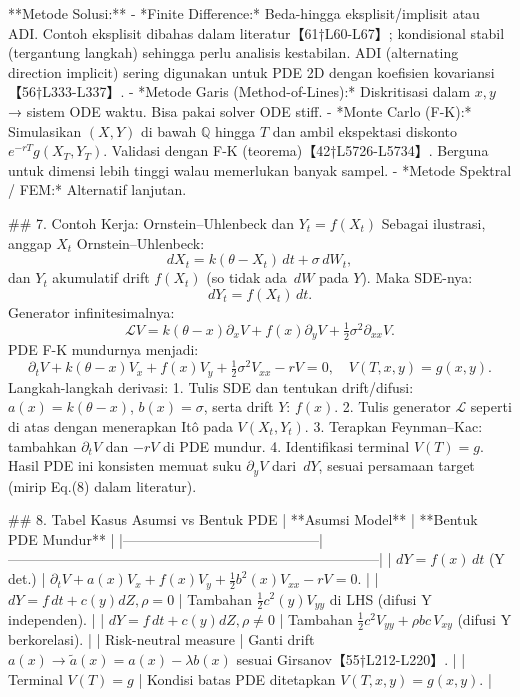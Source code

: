 \documentclass{article}
\begin{document}
**Metode Solusi:**  
- *Finite Difference:* Beda-hingga eksplisit/implisit atau ADI. Contoh eksplisit dibahas dalam literatur【61†L60-L67】; kondisional stabil (tergantung langkah) sehingga perlu analisis kestabilan. ADI (alternating direction implicit) sering digunakan untuk PDE 2D dengan koefisien kovariansi【56†L333-L337】.  
- *Metode Garis (Method-of-Lines):* Diskritisasi dalam \(x,y\) → sistem ODE waktu. Bisa pakai solver ODE stiff.  
- *Monte Carlo (F-K):* Simulasikan \((X,Y)\) di bawah \(\mathbb{Q}\) hingga \(T\) dan ambil ekspektasi diskonto \(e^{-rT}g(X_T,Y_T)\). Validasi dengan F-K (teorema)【42†L5726-L5734】. Berguna untuk dimensi lebih tinggi walau memerlukan banyak sampel.  
- *Metode Spektral / FEM:* Alternatif lanjutan.  

## 7. Contoh Kerja: Ornstein–Uhlenbeck dan \(Y_t=f(X_t)\)  
Sebagai ilustrasi, anggap \(X_t\) Ornstein–Uhlenbeck:  
$$dX_t = k(\theta - X_t)\,dt + \sigma\,dW_t,$$ 
dan \(Y_t\) akumulatif drift \(f(X_t)\) (so tidak ada \(\,dW\) pada \(Y\)). Maka SDE-nya:  
$$dY_t = f(X_t)\,dt.$$  
Generator infinitesimalnya:  
$$\mathcal{L}V = k(\theta-x)\partial_xV + f(x)\partial_yV + \tfrac12\sigma^2\partial_{xx}V.$$  
PDE F-K mundurnya menjadi:  
$$\partial_tV + k(\theta-x)V_x + f(x)V_y + \tfrac12\sigma^2V_{xx} - rV = 0,\quad V(T,x,y)=g(x,y).$$  
Langkah-langkah derivasi:  
1. Tulis SDE dan tentukan drift/difusi: \(a(x)=k(\theta-x)\), \(b(x)=\sigma\), serta drift \(Y\): \(f(x)\).  
2. Tulis generator \(\mathcal{L}\) seperti di atas dengan menerapkan Itô pada \(V(X_t,Y_t)\).  
3. Terapkan Feynman–Kac: tambahkan \(\partial_tV\) dan \(-rV\) di PDE mundur.  
4. Identifikasi terminal \(V(T)=g\).  
Hasil PDE ini konsisten memuat suku \(\partial_yV\) dari \(\,dY\), sesuai persamaan target (mirip Eq.(8) dalam literatur).  

## 8. Tabel Kasus Asumsi vs Bentuk PDE  
| **Asumsi Model**                          | **Bentuk PDE Mundur**                                                         |
|------------------------------------------|--------------------------------------------------------------------------------|
| \(dY=f(x)\,dt\) (Y det.)               | \(\partial_tV + a(x)V_x + f(x)V_y + \tfrac12b^2(x)V_{xx} -rV =0\).              |
| \(dY=f\,dt + c(y)dZ, \rho=0\)          | Tambahan \(\tfrac12c^2(y)V_{yy}\) di LHS (difusi Y independen).                |
| \(dY=f\,dt + c(y)dZ, \rho\neq 0\)      | Tambahan \(\tfrac12c^2V_{yy} + \rho bc\,V_{xy}\) (difusi Y berkorelasi).       |
| Risk-neutral measure                   | Ganti drift \(a(x)\to \tilde a(x)=a(x)-\lambda b(x)\) sesuai Girsanov【55†L212-L220】. |
| Terminal \(V(T)=g\)                     | Kondisi batas PDE ditetapkan \(V(T,x,y)=g(x,y)\).                              |
\end{document}

